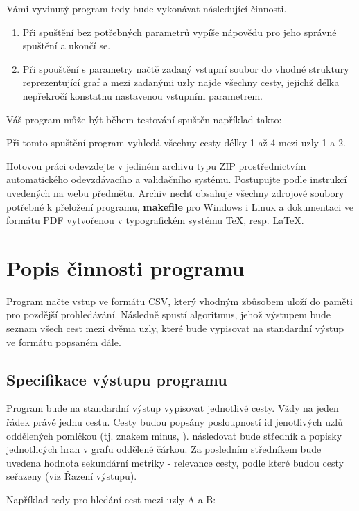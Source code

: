 Vámi vyvinutý program tedy bude vykonávat následující činnosti.
\begin{enumerate}
\item Při spuštění bez potřebných parametrů vypíše nápovědu pro jeho správné spuštění a ukončí se.
\item Při spouštění s parametry načtě zadaný vstupní soubor do vhodné struktury reprezentující graf a mezi zadanými uzly najde všechny cesty, jejichž délka nepřekročí konstatnu nastavenou vstupním parametrem.
\end{enumerate}

Váš program může být během testování spuštěn například takto:

\medskip
{} \par

\medskip
Při tomto spuštění program vyhledá všechny cesty délky 1 až 4 mezi uzly 1 a 2.

\medskip
Hotovou práci odevzdejte v jediném archivu typu ZIP prostřednictvím automatického odevzdávacího a validačního systému. Postupujte podle instrukcí uvedených na webu předmětu. Archiv nechť obsahuje všechny zdrojové soubory potřebné k přeložení programu, \textbf{makefile} pro Windows i Linux a dokumentaci ve formátu PDF vytvořenou v typografickém systému \TeX, resp. \LaTeX.

\section{Popis činnosti programu}
Program načte vstup ve formátu CSV, který vhodným zbůsobem uloží do paměti pro pozdější prohledávání. Následně spustí algoritmus, jehož výstupem bude seznam všech cest mezi dvěma uzly, které bude vypisovat na standardní výstup ve formátu popsaném dále.

\subsection{Specifikace výstupu programu}
Program bude na standardní výstup vypisovat jednotlivé cesty. Vždy na jeden řádek právě jednu cestu. Cesty budou popsány posloupností id jenotlivých uzlů oddělených pomlčkou (tj. znakem minus,  \uv{\textbf{-}}). následovat bude středník a popisky jednotlicých hran v grafu oddělené čárkou. Za posledním středníkem bude uvedena hodnota sekundární metriky - relevance cesty, podle které budou cesty seřazeny (viz Řazení výstupu).

\medskip
Například tedy pro hledání cest mezi uzly A a B:

